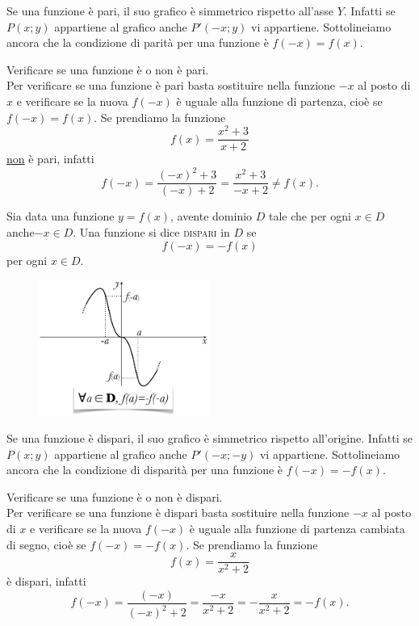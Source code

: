 Se una funzione è pari, il suo grafico è simmetrico rispetto all'asse $Y$. 
Infatti se $P(x;y)$ appartiene al grafico anche $P'(-x;y)$ vi appartiene. 
Sottolineiamo ancora che la condizione di parità per una funzione è $f(-x)= 
f(x)$.\\   

\begin{esempio} Verificare se una funzione è o non è pari.\\
Per verificare se una funzione è pari basta sostituire nella funzione $-x$ al 
posto di $x$ e verificare se la nuova $f(-x)$ è uguale alla funzione di 
partenza, cioè se $f(-x)=f(x)$. Se prendiamo la funzione 
$$f(x)=\frac{x^2+3}{x+2}$$ \underline{non} è pari, infatti 
$$f(-x)=\frac{(-x)^2+3}{(-x)+2}=\frac{x^2+3}{-x+2}\neq f(x).$$
\end{esempio}

\begin{definizione}
Sia data una funzione $y=f(x)$, avente dominio $D$ tale che per ogni $x\in D$ 
anche$ -x\in D.$ Una funzione si dice \textsc{dispari} in $D$ se\\
$$f(-x)=-f(x)$$
per ogni $x\in D$.
\end{definizione}

\begin{figure}[htpb!]
  \centering
  \includegraphics[width=0.5\textwidth]{img/funz_10.png}
\end{figure}
%

Se una funzione è dispari, il suo grafico è simmetrico rispetto all'origine. 
Infatti se $P(x;y)$ appartiene al grafico anche $P'(-x;-y)$ vi appartiene. 
Sottolineiamo ancora che la condizione di disparità per una funzione è 
$f(-x)= -f(x)$. \\

\begin{esempio} Verificare se una funzione è o non è dispari.\\
Per verificare se una funzione è dispari basta sostituire nella funzione $-x$ 
al posto di $x$ e verificare se la nuova $f(-x)$ è uguale alla funzione di 
partenza cambiata di segno, cioè se $f(-x)=-f(x)$. Se prendiamo la funzione 
$$f(x)=\frac{x}{x^2+2}$$ è dispari, infatti 
$$f(-x)=\frac{(-x)}{(-x)^2+2}=\frac{-x}{x^2+2}=-\frac{x}{x^2+2}= -f(x).$$
\end{esempio}

